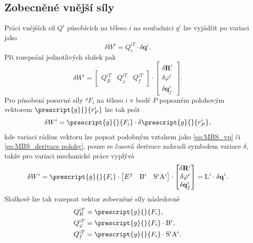 \subsection{Zobecněné vnější síly}
Práci vnějších sil $ Q^i $ působících na těleso $ i $ na souřadnici $ q^i $ lze vyjádřit po variaci jako
\begin{equation}\label{eq:MBS_deltaW}
	\delta W^i = Q^{iT}_e \cdot \delta \mathbf{q}^i.
\end{equation}
Při rozepsání jednotlivých složek pak
\begin{equation}\label{eq:MBS_dW mat}
	\delta W^i = 
	\begin{bmatrix}
		Q^{iT}_R & Q^{iT}_\varphi & Q^{iT}_f
	\end{bmatrix}
	\cdot
	\begin{bmatrix}
		\delta\mathbf{R}^i \\ 
		\delta\varphi^i \\ 
		\delta\mathbf{q}_{f}^{i}
	\end{bmatrix}.
\end{equation}
Pro působení posuvné síly $ ^gF_i $ na těleso $ i $ v bodě $ P $ popsaném polohovým vektorem $ \prescript{g}{}{r_{P}^{i}} $ lze tak psát
\begin{equation}\label{eq:MBS_Fp}
	\delta W^i = \prescript{g}{}{F_i} \cdot \delta \prescript{g}{}{r_{P}^{i}},
\end{equation}
kde variaci rádius vektoru lze popsat podobným vztahem jako \ref{eq:MBS_vp} či \ref{eq:MBS_derivace polohy}, pouze se časová derivace nahradí symbolem variace $ \delta $, takže pro variaci mechanické práce vyplývá
\begin{equation}\label{eq:MBS_dWi}
	\delta W^i = \prescript{g}{}{F_i} \cdot 
	\begin{bmatrix}
		E^2 & \mathrm{B}^i & \mathrm{S}^{i} \mathrm{A}^i
	\end{bmatrix} 
	\cdot
	\begin{bmatrix}
		\delta\mathbf{R}^i \\ 
		\delta\varphi^i \\ 
		\delta\mathbf{q}_{f}^{i}
	\end{bmatrix} 
	= \mathrm{L}^i \cdot \mathbf{\delta{q}}^i.
\end{equation}
Složkově lze tak rozepsat vektor zobecněné síly následovně
\begin{align}\label{eq:MBS_Q}
	Q_{R}^{iT}&= \prescript{g}{}{F_i} ,\\
	Q_{\varphi}^{iT}&= \prescript{g}{}{F_i} \cdot \mathrm{B}^i ,\\
	Q_{f}^{iT}&= \prescript{g}{}{F_i} \cdot \mathrm{S}^{i} \mathrm{A}^i .
\end{align}


